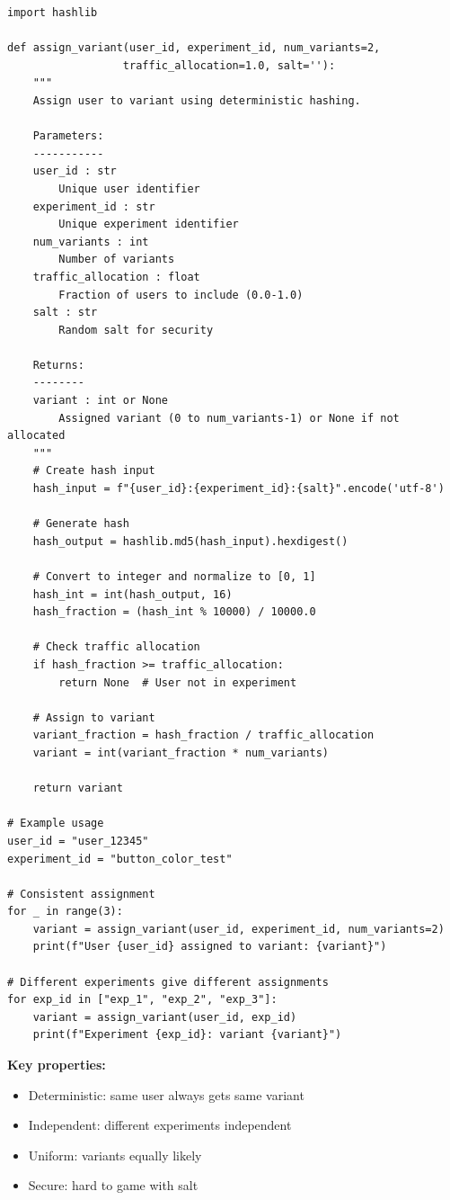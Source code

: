 \lstset{language=Python, caption=Hash-Based User Assignment}
\begin{lstlisting}
import hashlib

def assign_variant(user_id, experiment_id, num_variants=2,
                  traffic_allocation=1.0, salt=''):
    """
    Assign user to variant using deterministic hashing.

    Parameters:
    -----------
    user_id : str
        Unique user identifier
    experiment_id : str
        Unique experiment identifier
    num_variants : int
        Number of variants
    traffic_allocation : float
        Fraction of users to include (0.0-1.0)
    salt : str
        Random salt for security

    Returns:
    --------
    variant : int or None
        Assigned variant (0 to num_variants-1) or None if not allocated
    """
    # Create hash input
    hash_input = f"{user_id}:{experiment_id}:{salt}".encode('utf-8')

    # Generate hash
    hash_output = hashlib.md5(hash_input).hexdigest()

    # Convert to integer and normalize to [0, 1]
    hash_int = int(hash_output, 16)
    hash_fraction = (hash_int % 10000) / 10000.0

    # Check traffic allocation
    if hash_fraction >= traffic_allocation:
        return None  # User not in experiment

    # Assign to variant
    variant_fraction = hash_fraction / traffic_allocation
    variant = int(variant_fraction * num_variants)

    return variant

# Example usage
user_id = "user_12345"
experiment_id = "button_color_test"

# Consistent assignment
for _ in range(3):
    variant = assign_variant(user_id, experiment_id, num_variants=2)
    print(f"User {user_id} assigned to variant: {variant}")

# Different experiments give different assignments
for exp_id in ["exp_1", "exp_2", "exp_3"]:
    variant = assign_variant(user_id, exp_id)
    print(f"Experiment {exp_id}: variant {variant}")
\end{lstlisting}

\textbf{Key properties:}
\begin{itemize}
    \item Deterministic: same user always gets same variant
    \item Independent: different experiments independent
    \item Uniform: variants equally likely
    \item Secure: hard to game with salt
\end{itemize}

